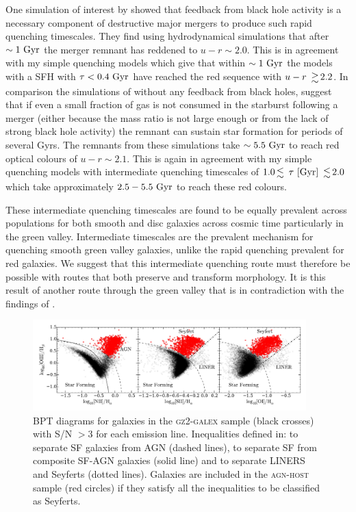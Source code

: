 \documentclass[useAMS,usenatbib]{mn2e}
\begin{document}
One simulation of interest by \citet{Springel05} showed that feedback from black hole activity is a necessary component of destructive major mergers to produce such rapid quenching timescales. They find using hydrodynamical simulations that after $\sim1~\rm{Gyr}$ the merger remnant has reddened to $u-r \sim 2.0$. This is in agreement with my simple quenching models which give that within $\sim1~\rm{Gyr}$ the models with a SFH with $\tau < 0.4~\rm{Gyr}$ have reached the red sequence with $u-r ~\ga 2.2$. In comparison the simulations of \citet{Springel05} without any feedback from black holes, suggest that if even a small fraction of gas is not consumed in the starburst following a merger (either because the mass ratio is not large enough or from the lack of strong black hole activity) the remnant can sustain star formation for periods of several Gyrs. The remnants from these simulations take $\sim5.5~\rm{Gyr}$ to reach red optical colours of $u-r \sim 2.1$. This is again in agreement with my simple quenching models with intermediate quenching timescales of $1.0 \la ~\tau~\rm{[Gyr]} ~\la 2.0$ which take approximately $2.5-5.5~\rm{Gyr}$ to reach these red colours.

These intermediate quenching timescales are found to be equally prevalent across populations for both smooth and disc galaxies across cosmic time particularly in the green valley. Intermediate timescales are the prevalent mechanism for quenching smooth green valley galaxies, unlike the rapid quenching prevalent for red galaxies. We suggest that this intermediate quenching route must therefore be possible with routes that both preserve and transform morphology. It is this result of another route through the green valley that is in contradiction with the findings of \cite{Sch2014}. 

\begin{figure}
\includegraphics[width=0.94\textwidth]{GZ2_GALEX_sample_bpt_diagram_SNR_gtr_3_type_1_seyferts_only_better_quality.pdf}
\caption{BPT diagrams for galaxies in the \textsc{gz2-galex} sample (black crosses) with S/N $> 3$ for each emission line. Inequalities defined in: \cite{Kew01} to separate SF galaxies from AGN (dashed lines), \cite{Kauff03b} to separate SF from composite SF-AGN galaxies (solid line) and \cite{Kew06} to separate LINERS and Seyferts (dotted lines). Galaxies are included in the \textsc{agn-host} sample (red circles) if they satisfy all the inequalities to be classified as Seyferts.}
\label{bpt}
\end{figure}
\end{document}
